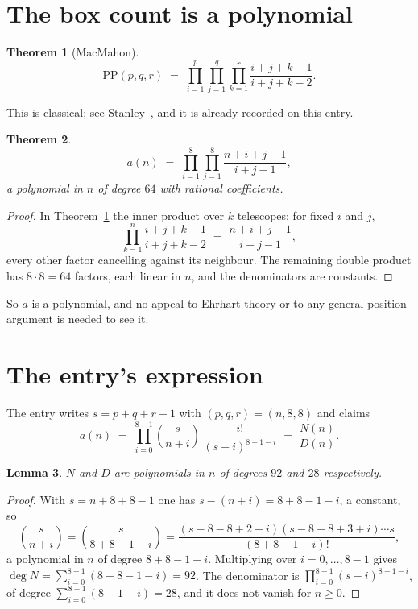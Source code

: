 \documentclass[11pt,a4paper]{article}
\theoremstyle{plain}
\newtheorem{theorem}{Theorem}
\newtheorem{lemma}[theorem]{Lemma}
\theoremstyle{definition}
\begin{document}
\section{The box count is a polynomial}

\begin{theorem}[MacMahon]\label{thm:mm}
\[
\mathrm{PP}(p,q,r)\;=\;\prod_{i=1}^{p}\prod_{j=1}^{q}\prod_{k=1}^{r}
\frac{i+j+k-1}{i+j+k-2} .
\]
\end{theorem}

This is classical; see Stanley~\cite{stanley}, and it is already recorded on this entry.

\begin{theorem}\label{thm:poly}
\[
a(n)\;=\;\prod_{i=1}^{8}\prod_{j=1}^{8}\frac{n+i+j-1}{i+j-1},
\]
a polynomial in $n$ of degree $64$ with rational coefficients.
\end{theorem}

\begin{proof}
In Theorem~\ref{thm:mm} the inner product over $k$ telescopes: for fixed $i$ and $j$,
\[
\prod_{k=1}^{n}\frac{i+j+k-1}{i+j+k-2}\;=\;\frac{n+i+j-1}{i+j-1} ,
\]
every other factor cancelling against its neighbour. The remaining double product has
$8\cdot8=64$ factors, each linear in $n$, and the denominators are constants.
\end{proof}

So $a$ is a polynomial, and no appeal to Ehrhart theory or to any general position argument is
needed to see it.

\section{The entry's expression}

The entry writes $s=p+q+r-1$ with $(p,q,r)=(n,8,8)$ and claims
\[
a(n)\;=\;\prod_{i=0}^{8-1}\binom{s}{n+i}\,\frac{i!}{(s-i)^{8-1-i}}\;=\;
\frac{N(n)}{D(n)} .
\]

\begin{lemma}\label{lem:deg}
$N$ and $D$ are polynomials in $n$ of degrees $92$ and $28$ respectively.
\end{lemma}

\begin{proof}
With $s=n+8+8-1$ one has $s-(n+i)=8+8-1-i$, a constant, so
\[
\binom{s}{n+i}=\binom{s}{8+8-1-i}
=\frac{(s-8-8+2+i)(s-8-8+3+i)\cdots s}{(8+8-1-i)!},
\]
a polynomial in $n$ of degree $8+8-1-i$. Multiplying over $i=0,\dots,8-1$ gives
$\deg N=\sum_{i=0}^{8-1}(8+8-1-i)=92$. The denominator is
$\prod_{i=0}^{8-1}(s-i)^{8-1-i}$, of degree
$\sum_{i=0}^{8-1}(8-1-i)=28$, and it does not vanish for $n\ge0$.
\end{proof}
\end{document}
